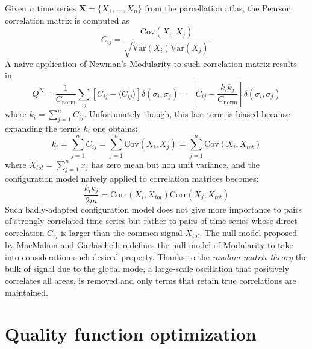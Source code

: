 Given $n$ time series $\mathbf{X}=\{ X_1, \ldots, X_n\}$ from the parcellation atlas, the Pearson correlation matrix is computed as
\begin{equation}
C_{ij} = \frac{\textrm{Cov}(X_i,X_j)}{\sqrt{\textrm{Var}(X_i)\textrm{Var}(X_j) }}.
\end{equation}
A naive application of Newman's Modularity to such correlation matrix results in:
\begin{equation}
Q^N= \frac{1}{C_{\textrm{norm}}} \sum \limits_{ij} \left[ C_{ij} - \langle C_{ij} \rangle \right] \delta(\sigma_i,\sigma_j) = \left[ C_{ij} - \frac{k_i k_j}{C_{\textrm{norm}}} \right] \delta(\sigma_i,\sigma_j)
\end{equation}
where $k_i=\sum_{j=1}^n C_{ij}$. Unfortunately though, this last term is biased because expanding the terms $k_i$ one obtains:
\begin{equation}
k_i =\sum_{j=1}^n C_{ij}= \sum_{j=1}^n \textrm{Cov}(X_i,X_j) = \sum_{j=1}^n \textrm{Cov}(X_i,X_{tot})
\end{equation}
where $X_{tot}=\sum_{j=1}^n x_j$ has zero mean but non unit variance, and the configuration model naively applied to correlation matrices becomes:
\begin{equation}
\frac{k_i k_j}{2m} = \textrm{Corr}(X_i,X_{tot})\textrm{Corr}(X_j,X_{tot})
\end{equation}
Such badly-adapted configuration model does not give more importance to pairs of strongly correlated time series but rather to pairs of time series whose direct correlation $C_{ij}$ is larger than the common signal $X_{tot}$.
The null model proposed by MacMahon and Garlaschelli redefines the null model of Modularity to take into consideration such desired property. Thanks to the \emph{random matrix theory} the bulk of signal due to the global mode, a large-scale oscillation that positively correlates all areas, is removed and only terms that retain true correlations are maintained.

\section{Quality function optimization}

